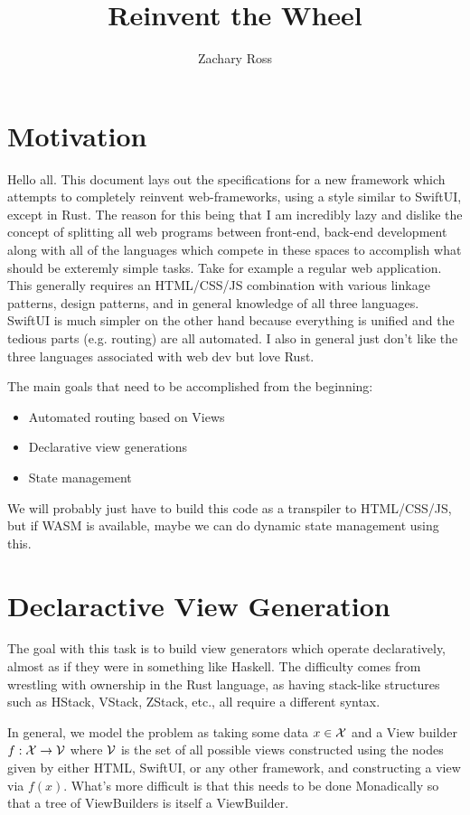 \documentclass{article}
\title{Reinvent the Wheel}
\author{Zachary Ross}
\begin{document}
\maketitle

\section{Motivation}%
\label{sec:motivation}

Hello all. This document lays out the specifications for a new framework which
attempts to completely reinvent web-frameworks, using a style similar to
SwiftUI, except in Rust. The reason for this being that I am incredibly lazy and
dislike the concept of splitting all web programs between front-end, back-end
development along with all of the languages which compete in these spaces to
accomplish what should be exteremly simple tasks. Take for example a regular web
application. This generally requires an HTML/CSS/JS combination with various
linkage patterns, design patterns, and in general knowledge of all three
languages. SwiftUI is much simpler on the other hand because everything is
unified and the tedious parts (e.g. routing) are all automated. I also in
general just don't like the three languages associated with web dev but love
Rust. 

The main goals that need to be accomplished from the beginning:
\begin{itemize}
    \item Automated routing based on Views
    \item Declarative view generations
    \item State management
\end{itemize}

We will probably just have to build this code as a transpiler to HTML/CSS/JS,
but if WASM is available, maybe we can do dynamic state management using this.

\section{Declaractive View Generation}%
\label{sec:declaractive_view_generation}

The goal with this task is to build view generators which operate declaratively,
almost as if they were in something like Haskell. The difficulty comes from
wrestling with ownership in the Rust language, as having stack-like structures
such as HStack, VStack, ZStack, etc., all require a different syntax.

In general, we model the problem as taking some data $x \in \cal X$ and a View
builder $f: \cal X \rightarrow \cal V$ where $\cal V$ is the set of all possible
views constructed using the nodes given by either HTML, SwiftUI, or any other
framework, and constructing a view via $f(x)$. What's more difficult is that
this needs to be done Monadically so that a tree of ViewBuilders is itself a
ViewBuilder.

    
\end{document}
